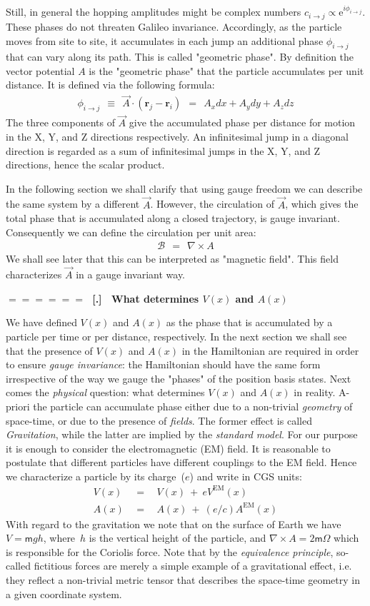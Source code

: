 \documentclass[onecolumn,fleqn]{revtex4}
\newcommand{\eexp}{\mathrm{e}^}
\newcommand{\mass}{\mathsf{m}}
\newcommand{\tbox}[1]{\text{#1}}
\newcommand{\beq}{\begin{eqnarray}}
\newcommand{\eeq}{\end{eqnarray}}
\renewcommand{\thesubsection}{\arabic{subsection}}
\renewcommand{\thesubsubsection}{\arabic{subsubsection}}
\newcommand{\sheadC}[1]
{
\addtocounter{subsubsection}{1}
\vspace{5mm}
{\Large\bf $=\!=\!=\!=\!=\!=\;$ [\thesubsection.\thesubsubsection] \ #1}  
\nopagebreak
\phantomsection
}
\begin{document}
Still, in general the hopping amplitudes 
might be complex numbers ${c_{i \rightarrow j} \propto \eexp{i \phi_{i \rightarrow j} }}$.
These phases do not threaten Galileo invariance.
Accordingly, as the particle moves from site to site, 
it accumulates in each jump an additional phase $\phi_{i \rightarrow j}$ 
that can vary along its path. This is called "geometric phase".
By definition the vector potential $A$ is the "geometric phase" 
that the particle accumulates per unit distance. 
It is defined via the following formula:
\beq 
\phi_{i \rightarrow j} \ \ \equiv \ \ \vec{A}\cdot (\mathbf{r}_j-\mathbf{r}_i) 
\ \ = \ \ A_x dx + A_y dy + A_z dz
\eeq
The three components of $\vec{A}$ give the accumulated phase per distance 
for motion in the X, Y, and Z directions respectively.
An infinitesimal jump in a diagonal direction is regarded as a sum 
of infinitesimal jumps in the X, Y, and Z directions, hence the scalar product. 
 

In the following section we shall clarify that using gauge freedom 
we can describe the same system by a different $\vec{A}$. 
However, the circulation of $\vec{A}$, which gives the total phase 
that is accumulated along a closed trajectory, is gauge invariant. 
Consequently we can define the circulation per unit area:
\beq 
\mathcal{B} \ \ = \ \ \nabla \times A
\eeq
We shall see later that this can be interpreted as "magnetic field".
This field characterizes $\vec{A}$ in a gauge invariant way.



\sheadC{What determines $V(x)$ and $A(x)$}

We have defined $V(x)$ and $A(x)$ as the phase that is accumulated 
by a particle per time or per distance, respectively. In the next section 
we shall see that the presence of $V(x)$ and $A(x)$ in the Hamiltonian 
are required in order to ensure {\em gauge invariance}: the Hamiltonian 
should have the same form irrespective of the way we gauge the "phases" 
of the position basis states. Next comes the {\em physical} question: 
what determines $V(x)$ and $A(x)$ in reality. A-priori the particle 
can accumulate phase either due to a non-trivial {\em geometry} of 
space-time, or due to the presence of {\em fields}. The former effect is 
called {\em Gravitation}, while the latter are implied by the {\em standard model}. 
For our purpose it is enough to consider the electromagnetic (EM) field.
It is reasonable to postulate that different particles have different 
couplings to the EM field. Hence we characterize a particle by its charge~($e$)
and write in CGS units:
\beq 
V(x) \ \ &=& \ \  V(x) \ + \ eV^{\tbox{EM}}(x) \\
A(x) \ \ &=& \ \  A(x) \ + \ (e/c)A^{\tbox{EM}}(x)
\eeq
With regard to the gravitation we note that on the surface of Earth  
we have ${V=\mass gh}$, where~$h$ is the vertical height of the particle, 
and ${\nabla \times A = 2\mass\Omega}$ which is responsible for the Coriolis force.   
Note that by the {\em equivalence principle}, so-called fictitious 
forces are merely a simple example of a gravitational effect, 
i.e. they reflect a non-trivial metric tensor that describes 
the space-time geometry in a given coordinate system.
\end{document}
